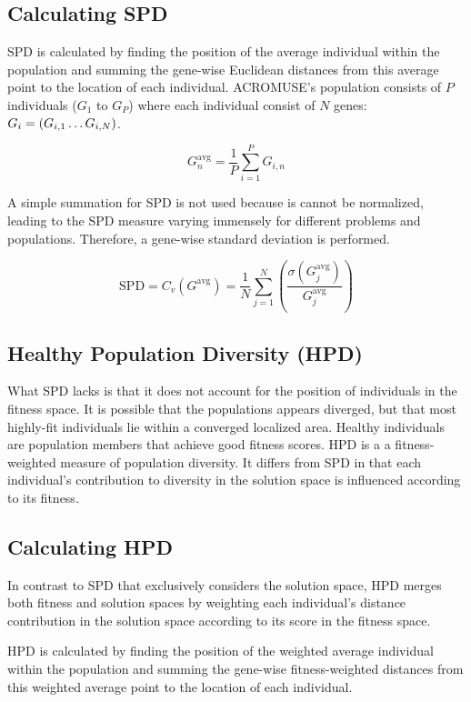 \documentclass[../main.tex]{subfiles}
\begin{document}
\subsection{Calculating SPD}

SPD is calculated by finding the position of the average individual within the population and summing the gene-wise
Euclidean distances from this average point to the location of each individual. ACROMUSE’s population consists of $P$
individuals ($G_1$ to $G_P$) where each individual consist of $N$ genes: $G_i = (G_{i,1} \mathellipsis G_{i,N})$.

\begin{equation}
G_n^{\text{avg}} = \frac{1}{P} \sum_{i=1}^P G_{i,n}
\end{equation}

A simple summation for SPD is not used because is cannot be normalized, leading to the SPD measure varying immensely
for different problems and populations. Therefore, a gene-wise standard deviation is performed.

\begin{equation}
\text{SPD} = C_v(G^{\text{avg}}) = \frac{1}{N} \sum_{j=1}^N \left( \frac{\sigma (G^{\text{avg}}_j)}{G^{\text{avg}}_j}
\right)
\end{equation}

\subsection{Healthy Population Diversity (HPD)}
What SPD lacks is that it does not account for the position of individuals in the fitness space. It is possible that
the populations appears diverged, but that most highly-fit individuals lie within a converged localized area. Healthy
individuals are population members that achieve good fitness scores. HPD is a a fitness-weighted measure of population
diversity. It differs from SPD in that each individual's contribution to diversity in the solution space is influenced
according to its fitness.

\subsection{Calculating HPD}
In contrast to SPD that exclusively considers the solution space, HPD merges both fitness and solution spaces by
weighting each individual's distance contribution in the solution space according to its score in the fitness space.

HPD is calculated by finding the position of the weighted average individual within the population and summing the
gene-wise fitness-weighted distances from this weighted average point to the location of each individual.
\end{document}
